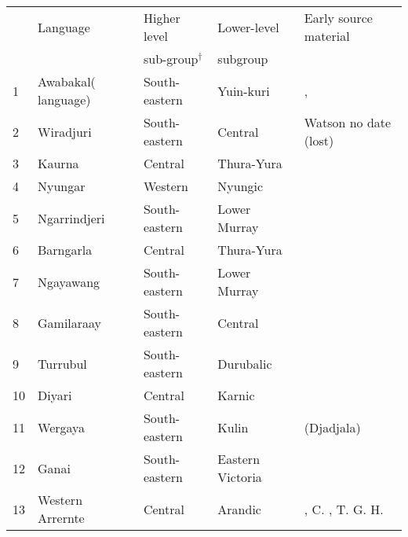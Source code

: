 \begin{table}
{\footnotesize
    \begin{tabularx}{\textwidth}{lp{2.5cm}llQ}
        \lsptoprule
        & Language  & Higher level & Lower-level & Early source material\\
        &			&  sub-group$^{\dagger}$ &  subgroup & \\
         &	Awabakal\newline ( language) &	South-eastern	& Yuin-kuri & \citealt{Threlkeld1834}, \citealt{hale_languages_1846}\\
        2 &	Wiradjuri &	South-eastern	& Central  & Watson no date (lost) \citealt{Günther1838,gunther_lecture_1840,hale_languages_1846,mathews_wiradyuri_1904}\\
        3 &	Kaurna &	Central	& Thura-Yura & \citealt{TeichelmannSchürmann1840}\\
        4 &	Nyungar &	Western	& Nyungic & \citealt{Symmons1841}\\
        5 &	Ngarrindjeri  &	South-eastern	& Lower Murray & \citealt{meyer_vocabulary_1843,taplin_vocabulary_1867,taplin_notes_1872,Taplin1880}\\
        6 &	Barngarla &	Central	& Thura-Yura & \citealt{schurmann_vocabulary_1844} \\
        7 &	Ngayawang  &	South-eastern	& Lower Murray & \citealt{Moorhouse1846}\\
        8 &	Gamilaraay &	South-eastern	& Central  & 
        \citealt{ridley_kamilaroi_1855, ridley_kamilaroi_1855-1, ridley_kamilaroi_1856, ridley_kamilaroi_1866,ridley_kamilaroi_1875,mathews_languages_1903}\\
        9 &	Turrubul &	South-eastern	& Durubalic & \citealt{ridley_kamilaroi_1866}\\
        10 &	Diyari  &	Central	& Karnic & \citealt{koch_untitled_1868,Schoknecht1872,Flierl1880,reuther_ms_1899,planert_australische_1908,gatti_lingua_1930}\\
        11 &	Wergaya  &	South-eastern	& Kulin & \citealt{hagenauer_language_1878,mathews_aboriginal_1902} (Djadjala)\\
        12 &	Ganai  &	South-eastern	& Eastern Victoria & \citealt{bulmer_language_1878}\\
        13 &	Western Arrernte  &	Central	& Arandic & \citealt{Kempe1891}, C. \citealt{strehlow_grammatik_1931,strehlow_einige_1908,strehlow_notitle_1910,mathews_arranda_1907,planert_australische_1907,riedel_notitle_1931}, T. G. H. \citealt{strehlow_aranda_1944} \\

\end{tabularx}}
\end{table}

